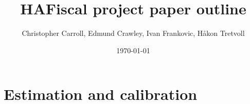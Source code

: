 \documentclass[11pt]{article}
\title{ HAFiscal project paper outline}
\author{Christopher Carroll, Edmund Crawley, Ivan Frankovic, Håkon Tretvoll}
\date{\today}
\begin{document}
	\maketitle
	

	
	
	
	
	
	\section{Estimation and calibration}	
		
	
	
	
	
	
		
	
	
	
	\let\bibfont=\small
	
	
	
	
	
\end{document}
